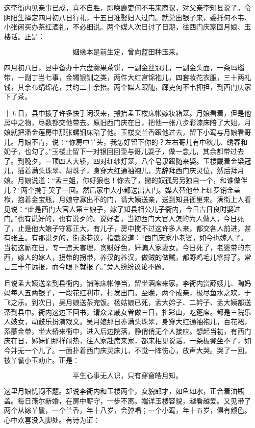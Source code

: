 这李衙内见亲事已成，喜不自胜，即唤廊吏何不韦来商议，对父亲李知县说了。令阴阳生择定四月初八日行礼，十五日准娶妇人过门。就兑出银子来，委托何不韦、小张闲买办茶红酒礼，不必细说。两个媒人次日讨了日期，往西门庆家回月娘、玉楼话。正是：

\[
姻缘本是前生定，曾向蓝田种玉来。
\]

四月初八日，县中备办十六盘羹果茶饼，一副金丝冠儿，一副金头面，一条玛瑙带，一副丁当七事，金镯银钏之类，两件大红宫锦袍儿，四套妆花衣服，三十两礼钱，其余布绢绵花，共约二十余抬。两个媒人跟随，廊吏何不韦押担，到西门庆家下了茶。

十五日，县中拨了许多快手闲汉来，搬抬孟玉楼床帐嫁妆箱笼。月娘看着，但是他房中之物，尽数都交他带去。原旧西门庆在日，把他一张八步彩漆床陪了大姐，月娘就把潘金莲房中那张螺钿床陪了他。玉楼交兰香跟他过去，留下小鸾与月娘看哥儿。月娘不肯，说：“你房中丫头，我怎好留下你的？左右哥儿有中秋儿、绣春和奶子，也勾了。”玉楼止留下一对银回回壶与哥儿耍子，做一念儿，其余都带过去了。到晚夕，一顶四人大轿，四对红纱灯笼，八个皂隶跟随来娶。玉楼戴着金梁冠儿，插着满头珠翠、胡珠子，身穿大红通袖袍儿，先辞拜西门庆灵位，然后拜月娘。月娘说道：“孟三姐，你好狠也！你去了，撇的奴孤另另独自一个，和谁做伴儿？”两个携手哭了一回。然后家中大小都送出大门。媒人替他带上红罗销金盖袱，抱着金宝瓶，月娘守寡出不的门，请大姨送亲，送到知县衙里来。满街上人看见说：“此是西门大官人第三娘子，嫁了知县相公儿子衙内，今日吉日良时娶过门。”也有说好的，也有说歹的。说好者，当初西门大官人怎的为人做人，今日死了，止是他大娘子守寡正大，有儿子，房中搅不过这许多人来，都交各人前进，甚有张主。有那说歹的，街谈巷议，指戳说道：“西门庆家小老婆，如今也嫁人了。当初这厮在日，专一违天害理，贪财好色，奸骗人家妻女。今日死了，老婆带的东西，嫁人的嫁人，拐带的拐带，养汉的养汉，做贼的做贼，都野鸡毛儿零撏了。常言三十年远报，而今眼下就报了。”旁人纷纷议论不题。

且说孟大姨送亲到县衙内，铺陈床帐停当，留坐酒席来家。李衙内赏薛嫂儿、陶妈妈每人五两银子，一段花红利市，打发出门。至晚，两个成亲，极尽鱼水之欢，于飞之乐。到次日，吴月娘送茶完饭。杨姑娘已死，孟大妗子、二妗子、孟大姨都送茶到县中。衙内这边下回书，请众亲戚女眷做三日，扎彩山，吃筵席。都是三院乐人妓女，动鼓乐扮演戏文。吴月娘那日亦满头珠翠，身穿大红通袖袍儿，百花裙，系蒙金带，坐大轿来衙中，进入后边院落，静俏俏无个人接应。想起当初，有西门庆在日，姊妹们那样闹热，往人家赴席来家，都来相见说话，一条板凳坐不了，如今并无一个儿了。一面扑着西门庆灵床儿，不觉一阵伤心，放声大哭。哭了一回，被丫鬟小玉劝止。正是：

\[
平生心事无人识，只有穿窗皓月知。
\]

这里月娘忧闷不题。却说李衙内和玉楼两个，女貌郎才，如鱼如水，正合着油瓶盖。每日燕尔新婚，在房中厮守，一步不离。端详玉楼容貌，越看越爱。又见带了两个从嫁丫鬟，一个兰香，年十八岁，会弹唱；一个小鸾，年十五岁，俱有颜色。心中欢喜没入脚处。有诗为证：

